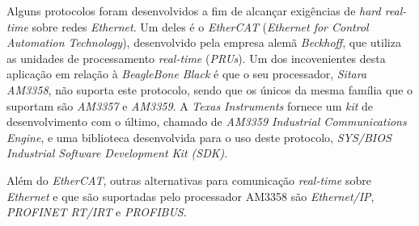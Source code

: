 Alguns protocolos foram desenvolvidos a fim de alcançar exigências de
\textit{hard real-time} sobre redes \textit{Ethernet}. Um deles é o
\textit{EtherCAT} (\textit{Ethernet for Control Automation Technology}),
desenvolvido pela empresa alemã \textit{Beckhoff}, que utiliza as unidades de
processamento \textit{real-time} (\textit{PRUs}). Um dos incovenientes desta
aplicação em relação à \textit{BeagleBone Black} é que o seu processador,
\textit{Sitara AM3358}, não suporta este protocolo, sendo que os únicos da mesma
família que o suportam são \textit{AM3357} e \textit{AM3359}. A \textit{Texas
Instruments} fornece um \textit{kit} de desenvolvimento com o último, chamado de
\textit{AM3359 Industrial Communications Engine}, e uma biblioteca desenvolvida
para o uso deste protocolo, \textit{SYS/BIOS Industrial Software Development Kit
(SDK)}.

\vspace{12pt}

Além do \textit{EtherCAT}, outras alternativas para comunicação
\textit{real-time} sobre \textit{Ethernet} e que são suportadas pelo processador
AM3358 são \textit{Ethernet/IP}, \textit{PROFINET RT/IRT} e \textit{PROFIBUS}.
